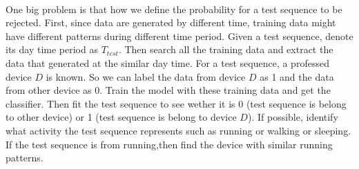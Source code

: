 \documentclass{article}
\begin{document}
	\paragraph{} One big problem is that how we define the probability for a test sequence to be rejected. First, since data are generated by different time, training data might have different patterns during different time period. Given a test sequence, denote its day time period as $T_{test}$. Then search all the training data and extract the data that generated at the similar day time. For a test sequence, a professed device $D$ is known. So we can label the data from device $D$ as 1 and the data from other device as 0. Train the model with these training data and get the classifier. Then fit the test sequence to see wether it is 0 (test sequence is belong to other device) or 1 (test sequence is belong to device $D$). If possible, identify what activity the test sequence represents such as running or walking or sleeping. If the test sequence is from running,then find the device with similar running patterns.
	
	
\end{document}
